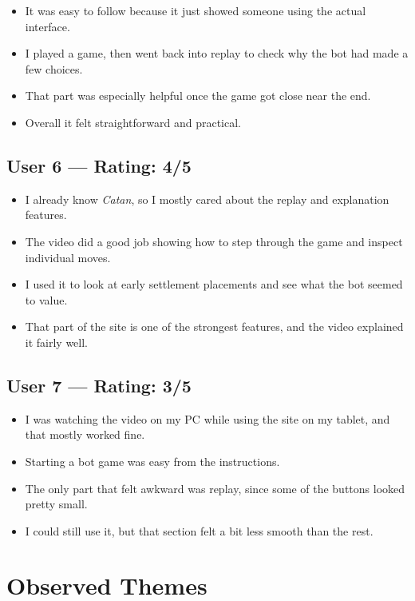 \documentclass{article}
\begin{document}
\begin{itemize}
    \item It was easy to follow because it just showed someone using the actual interface.
    \item I played a game, then went back into replay to check why the bot had made a few choices.
    \item That part was especially helpful once the game got close near the end.
    \item Overall it felt straightforward and practical.
\end{itemize}

\subsection{User 6 --- Rating: 4/5}

\begin{itemize}
    \item I already know \emph{Catan}, so I mostly cared about the replay and explanation features.
    \item The video did a good job showing how to step through the game and inspect individual moves.
    \item I used it to look at early settlement placements and see what the bot seemed to value.
    \item That part of the site is one of the strongest features, and the video explained it fairly well.
\end{itemize}

\subsection{User 7 --- Rating: 3/5}

\begin{itemize}
    \item I was watching the video on my PC while using the site on my tablet, and that mostly worked fine.
    \item Starting a bot game was easy from the instructions.
    \item The only part that felt awkward was replay, since some of the buttons looked pretty small.
    \item I could still use it, but that section felt a bit less smooth than the rest.
\end{itemize}

\section{Observed Themes}
\end{document}
